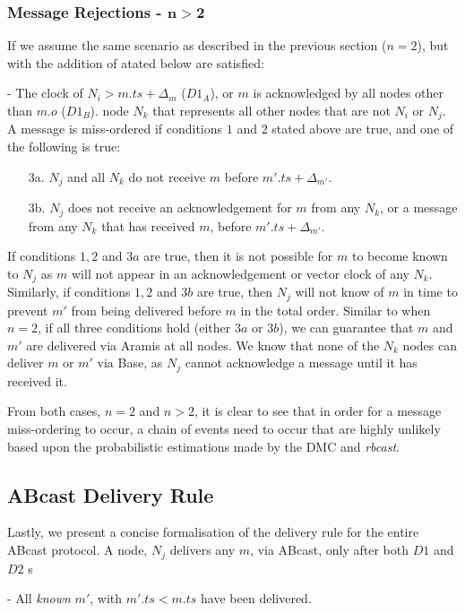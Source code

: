         \subsubsection*{Message Rejections - $\boldsymbol{n > 2}$}
        If we assume the same scenario as described in the previous section ($n=2$), but with the addition of atated below are satisfied:
	    \begin{description}[labelindent=1cm]
	        \item[$\boldsymbol{D1}$] - The clock of $N_i > m.ts + \Delta_{m}$ ($D1_A$), or $m$ is acknowledged by all nodes other than $m.o$ ($D1_B$).  node $N_k$ that represents all other nodes that are not $N_i$ or $N_j$.  A message is miss-ordered if conditions $1$ and $2$ stated above are true, and one of the following is true:
        
        \begin{itemize}
            \item[3a.] $N_j$ and all $N_k$ do not receive $m$ before $m'.ts + \Delta_{m'}$.
            
            \item[3b.] $N_j$ does not receive an acknowledgement for $m$ from any $N_k$, or a message from any $N_k$ that has received $m$, before $m'.ts + \Delta_{m'}$.  
        \end{itemize}
        
        If conditions $1,2$ and $3a$ are true, then it is not possible for $m$ to become known to $N_j$ as $m$ will not appear in an acknowledgement or vector clock of any $N_k$.  Similarly, if conditions $1,2$ and $3b$ are true, then $N_j$ will not know of $m$ in time to prevent $m'$ from being delivered before $m$ in the total order.  Similar to when $n=2$, if all three conditions hold (either $3a$ or $3b$), we can guarantee that $m$ and $m'$ are delivered via \textsf{Aramis} at all nodes.  We know that none of the $N_k$ nodes can deliver $m$ or $m'$ via \textsf{Base}, as $N_j$ cannot acknowledge a message until it has received it.  
        
        From both cases, $n=2$ and $n>2$, it is clear to see that in order for a message miss-ordering to occur, a chain of events need to occur that are highly unlikely based upon the probabilistic estimations made by the DMC and \emph{rbcast}.  
        		
    \subsection{ABcast Delivery Rule}
    Lastly, we present a concise formalisation of the delivery rule for the entire \textsf{ABcast} protocol.  A node, $N_j$ delivers any $m$, via \textsf{ABcast}, only after both $D1$ and $D2$ s
	        \item[$\boldsymbol{D2}$] - All \emph{known} $m'$, with $m'.ts < m.ts$ have been delivered.
	    \end{description}
	    
